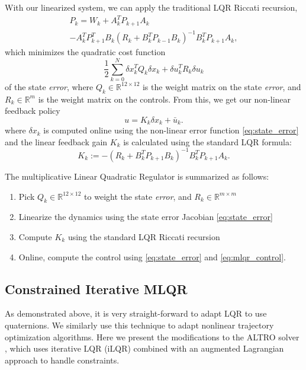 \documentclass[letterpaper, 10 pt, conference]{ieeeconf}  %
\newcommand{\half}{\frac{1}{2}}
\newcommand{\R}{\mathbb{R}}
\begin{document}
    With our linearized system, we can apply the traditional LQR Riccati recursion,
    \begin{multline}
         P_k = W_k +  A_k^T P_{k+1} A_k \\
         - A_k^T P_{k+1}^T B_k (R_k + B_k^T P_{k-1} B_k)^{-1} B_k^T P_{k+1} A_k ,
    \end{multline}
    which minimizes the quadratic cost function
    \begin{equation}
        \half \sum_{k=0}^N \delta x_k^T Q_k \delta x_k + \delta u_k^T R_k \delta u_k
    \end{equation}
    of the state \emph{error}, where $Q_k \in \R^{12 \times 12}$ is the weight matrix on
    the state \emph{error}, and $R_k \in \R^m$ is the weight matrix on the controls. From
    this, we get our non-linear feedback policy
    \begin{equation} \label{eq:mlqr_control}
        u = K_k \delta x_k + \bar{u}_k.
    \end{equation}
    where $\delta x_k$ is computed online using the non-linear error function
    \eqref{eq:state_error} and the linear feedback gain $K_k$ is calculated using the
    standard LQR formula:
    \begin{equation} \label{eq:LQR_gain}
         K_k := -(R_k + B_k^T P_{k+1} B_k)^{-1} B_k^T P_{k+1} A_k.
    \end{equation}
    
    The multiplicative Linear Quadratic Regulator is summarized as follows:
    \begin{enumerate}
        \item Pick $Q_k \in \R^{12 \times 12}$ to weight the state \textit{error}, and $R_k \in \R^{m \times m}$
        \item Linearize the dynamics using the state error Jacobian \eqref{eq:state_error}
        \item Compute $K_k$ using the standard LQR Riccati recursion
        \item Online, compute the control using \eqref{eq:state_error} and \eqref{eq:mlqr_control}.
    \end{enumerate}

    \subsection{Constrained Iterative MLQR}
        As demonstrated above, it is very straight-forward to adapt LQR to use
        quaternions. We similarly use this technique to adapt nonlinear trajectory
        optimization algorithms. Here we present the modifications to the ALTRO solver
        \cite{howell2019altro}, which uses iterative LQR (iLQR) combined with an
        augmented Lagrangian approach to handle constraints.
        
\end{document}
